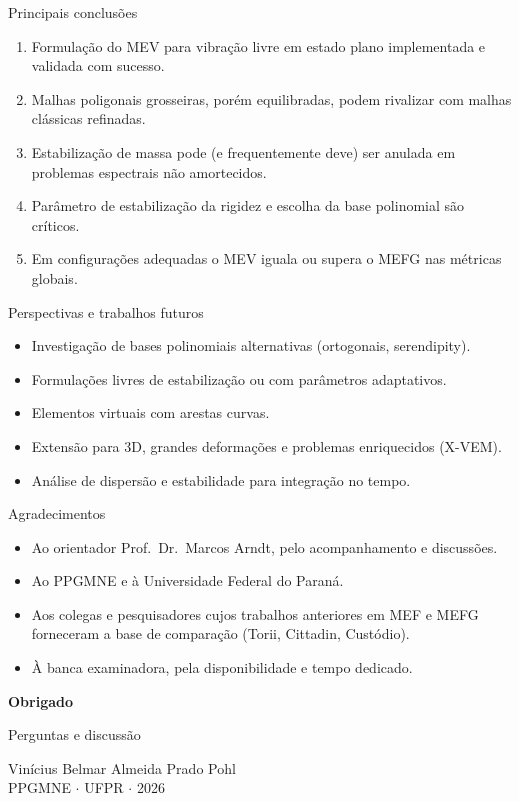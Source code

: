 \documentclass[aspectratio=169]{beamer}
\begin{document}
{\begin{frame}{Principais conclusões}
  \begin{enumerate}
    \item Formulação do MEV para vibração livre em estado plano implementada e validada com sucesso.
    \item Malhas poligonais grosseiras, porém equilibradas, podem rivalizar com malhas clássicas refinadas.
    \item Estabilização de massa pode (e frequentemente deve) ser anulada em problemas espectrais não amortecidos.
    \item Parâmetro de estabilização da rigidez e escolha da base polinomial são críticos.
    \item Em configurações adequadas o MEV iguala ou supera o MEFG nas métricas globais.
  \end{enumerate}
\end{frame}

\begin{frame}{Perspectivas e trabalhos futuros}
  \begin{itemize}
    \item Investigação de bases polinomiais alternativas (ortogonais, serendipity).
    \item Formulações livres de estabilização ou com parâmetros adaptativos.
    \item Elementos virtuais com arestas curvas.
    \item Extensão para 3D, grandes deformações e problemas enriquecidos (X-VEM).
    \item Análise de dispersão e estabilidade para integração no tempo.
  \end{itemize}
\end{frame}

\begin{frame}{Agradecimentos}
  \begin{itemize}
    \item Ao orientador Prof.\ Dr.\ Marcos Arndt, pelo acompanhamento e discussões.
    \item Ao PPGMNE e à Universidade Federal do Paraná.
    \item Aos colegas e pesquisadores cujos trabalhos anteriores em MEF e MEFG forneceram a base de comparação (Torii, Cittadin, Custódio).
    \item À banca examinadora, pela disponibilidade e tempo dedicado.
  \end{itemize}
\end{frame}

\begin{frame}
  \centering
  \vspace{1.5cm}
  {\LARGE\bfseries Obrigado}

  \vspace{0.8cm}
  {\large Perguntas e discussão}

  \vspace{1.8cm}
  Vinícius Belmar Almeida Prado Pohl\\[0.3em]
  PPGMNE $\cdot$ UFPR $\cdot$ 2026
\end{frame}

} %
\end{document}
